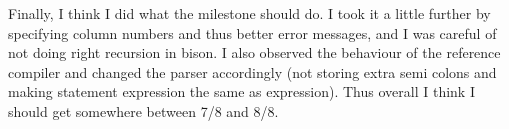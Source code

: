 \documentclass{article}
\begin{document}
Finally, I think I did what the milestone should do. I took it a little further by specifying column numbers and thus better error messages, and I was careful of not doing right recursion in bison. I also observed the behaviour of the reference compiler and changed the parser accordingly (not storing extra semi colons and making statement expression the same as expression).
Thus overall I think I should get somewhere between 7/8 and 8/8.
\end{document}
